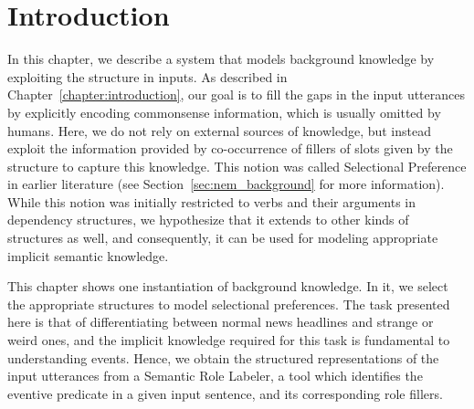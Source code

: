 \section{Introduction}
In this chapter, we describe a system that models background knowledge by exploiting the structure
in inputs. As described in Chapter~\ref{chapter:introduction}, our goal is to fill the gaps in the input utterances
by explicitly encoding commonsense information, which is usually omitted by humans. Here, we do not rely on external
sources of knowledge, but instead exploit the information provided by co-occurrence of fillers of slots given by the structure to
capture this knowledge. This notion was called Selectional Preference \citep{wilks1973preference}
in earlier literature (see Section~\ref{sec:nem_background} for more information). While this notion was initially
restricted to verbs and their arguments in dependency structures, we hypothesize that it extends to
other kinds of structures as well, and consequently, it can be used for modeling appropriate implicit semantic knowledge.

This chapter shows one instantiation of background knowledge. In it, we select the appropriate structures to model selectional
preferences. The task presented here is that of differentiating between normal news headlines and strange or weird ones,
and the implicit knowledge required for this task is fundamental to understanding events. Hence, we obtain the structured
representations of the input utterances from a Semantic Role Labeler, a tool which identifies the eventive predicate in a given
input sentence, and its corresponding role fillers.

